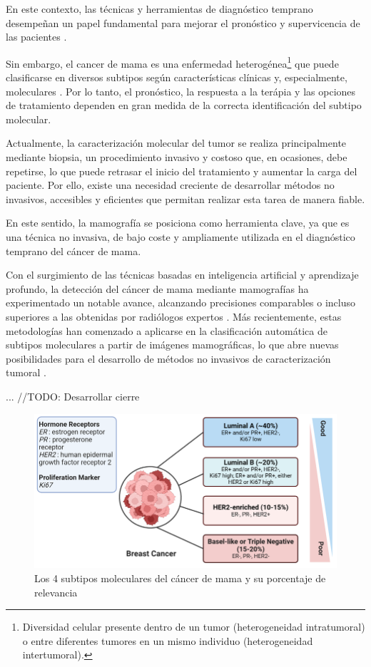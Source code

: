 \documentclass[a4paper,10pt]{book}
\begin{document}
En este contexto, las técnicas y herramientas de diagnóstico temprano desempeñan un papel fundamental para mejorar el pronóstico y supervicencia de las pacientes \cite{wang_early_2017}. 

Sin embargo, el cancer de mama es una enfermedad heterogénea\footnote{Diversidad celular presente dentro de un tumor (heterogeneidad intratumoral) o entre diferentes tumores en un mismo individuo (heterogeneidad intertumoral).} que puede clasificarse en diversos subtipos según características clínicas y, especialmente, moleculares \cite{orrantia-borunda_subtypes_2022}. Por lo tanto, el pronóstico, la respuesta a la terápia y las opciones de tratamiento dependen en gran medida de la correcta identificación del subtipo molecular.

Actualmente, la caracterización molecular del tumor se realiza principalmente mediante biopsia, un procedimiento invasivo y costoso que, en ocasiones, debe repetirse, lo que puede retrasar el inicio del tratamiento y aumentar la carga del paciente. Por ello, existe una necesidad creciente de desarrollar métodos no invasivos, accesibles y eficientes que permitan realizar esta tarea de manera fiable.

En este sentido, la mamografía se posiciona como herramienta clave, ya que es una técnica no invasiva, de bajo coste y ampliamente utilizada en el diagnóstico temprano del cáncer de mama. 

Con el surgimiento de las técnicas basadas en inteligencia artificial y aprendizaje profundo, la detección del cáncer de mama mediante mamografías ha experimentado un notable avance, alcanzando precisiones comparables o incluso superiores a las obtenidas por radiólogos expertos \cite{pattanaik_breast_2022, meenalochini_deep_2024, zahoor_breast_2022}. Más recientemente, estas metodologías han comenzado a aplicarse en la clasificación automática de subtipos moleculares a partir de imágenes mamográficas, lo que abre nuevas posibilidades para el desarrollo de métodos no invasivos de caracterización tumoral \cite{mota_breast_2024, ben_rabah_multimodal_2025}. 

... //TODO: Desarrollar cierre

\begin{figure}
    \centering
    \includegraphics[width=0.8\linewidth]{reports/assets/subtypes.png}
    \caption{Los 4 subtipos moleculares del cáncer de mama y su porcentaje de relevancia \cite{harnessing_2024}}
    \label{fig:subtypes}
\end{figure}
\end{document}

